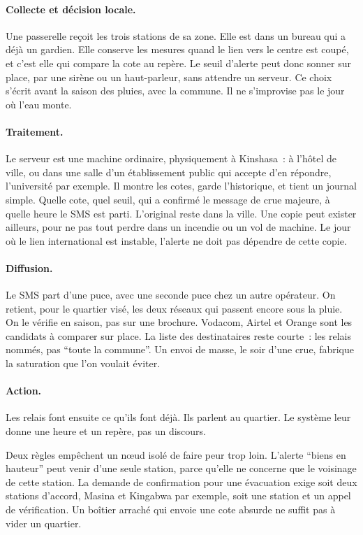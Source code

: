 \documentclass[12pt,a4paper]{article}
\begin{document}
\paragraph{Collecte et décision locale.}
Une passerelle reçoit les trois stations de sa zone. Elle est dans un bureau qui a déjà un gardien. Elle conserve les mesures quand le lien vers le centre est coupé, et c'est elle qui compare la cote au repère. Le seuil d'alerte peut donc sonner sur place, par une sirène ou un haut-parleur, sans attendre un serveur. Ce choix s'écrit avant la saison des pluies, avec la commune. Il ne s'improvise pas le jour où l'eau monte.

\paragraph{Traitement.}
Le serveur est une machine ordinaire, physiquement à Kinshasa~: à l'hôtel de ville, ou dans une salle d'un établissement public qui accepte d'en répondre, l'université par exemple. Il montre les cotes, garde l'historique, et tient un journal simple. Quelle cote, quel seuil, qui a confirmé le message de crue majeure, à quelle heure le SMS est parti. L'original reste dans la ville. Une copie peut exister ailleurs, pour ne pas tout perdre dans un incendie ou un vol de machine. Le jour où le lien international est instable, l'alerte ne doit pas dépendre de cette copie.

\paragraph{Diffusion.}
Le SMS part d'une puce, avec une seconde puce chez un autre opérateur. On retient, pour le quartier visé, les deux réseaux qui passent encore sous la pluie. On le vérifie en saison, pas sur une brochure. Vodacom, Airtel et Orange sont les candidats à comparer sur place. La liste des destinataires reste courte~: les relais nommés, pas \enquote{toute la commune}. Un envoi de masse, le soir d'une crue, fabrique la saturation que l'on voulait éviter.

\paragraph{Action.}
Les relais font ensuite ce qu'ils font déjà. Ils parlent au quartier. Le système leur donne une heure et un repère, pas un discours.

Deux règles empêchent un nœud isolé de faire peur trop loin. L'alerte \enquote{biens en hauteur} peut venir d'une seule station, parce qu'elle ne concerne que le voisinage de cette station. La demande de confirmation pour une évacuation exige soit deux stations d'accord, Masina et Kingabwa par exemple, soit une station et un appel de vérification. Un boîtier arraché qui envoie une cote absurde ne suffit pas à vider un quartier.
\end{document}
